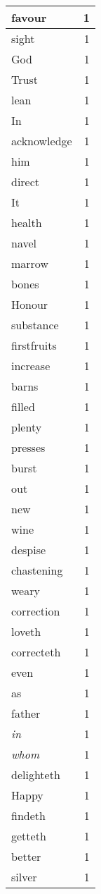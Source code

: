 \begin{center}
\begin{longtable}{l|r}
favour & 1\\ \hline 
sight & 1\\ \hline 
God & 1\\ \hline 
Trust & 1\\ \hline 
lean & 1\\ \hline 
In & 1\\ \hline 
acknowledge & 1\\ \hline 
him & 1\\ \hline 
direct & 1\\ \hline 
It & 1\\ \hline 
health & 1\\ \hline 
navel & 1\\ \hline 
marrow & 1\\ \hline 
bones & 1\\ \hline 
Honour & 1\\ \hline 
substance & 1\\ \hline 
firstfruits & 1\\ \hline 
increase & 1\\ \hline 
barns & 1\\ \hline 
filled & 1\\ \hline 
plenty & 1\\ \hline 
presses & 1\\ \hline 
burst & 1\\ \hline 
out & 1\\ \hline 
new & 1\\ \hline 
wine & 1\\ \hline 
despise & 1\\ \hline 
chastening & 1\\ \hline 
weary & 1\\ \hline 
correction & 1\\ \hline 
loveth & 1\\ \hline 
correcteth & 1\\ \hline 
even & 1\\ \hline 
as & 1\\ \hline 
father & 1\\ \hline 
\emph{in} & 1\\ \hline 
\emph{whom} & 1\\ \hline 
delighteth & 1\\ \hline 
Happy & 1\\ \hline 
findeth & 1\\ \hline 
getteth & 1\\ \hline 
better & 1\\ \hline 
silver & 1\\ \hline 

\end{longtable}
\end{center}
